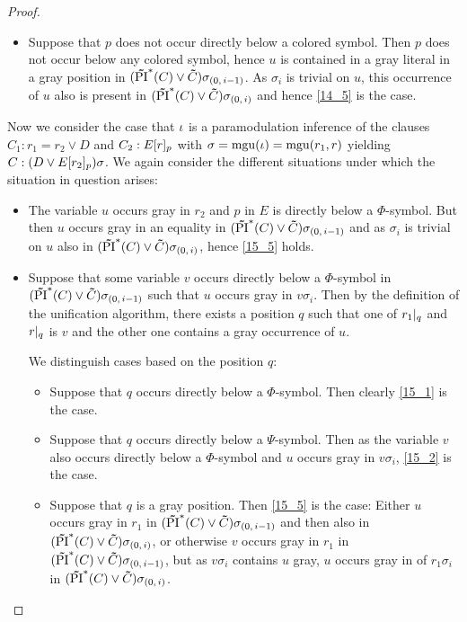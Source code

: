 \documentclass[%
	draft=false,%
	numbers=noendperiod,%
	11pt,%
	a4paper,%
	oneside,%
	openany,%
]{memoir}
\begin{document}
\begin{proof}
\begin{itemize}
\begin{itemize}
				\item
					Suppose that $p$ does not occur directly below a colored symbol.
					Then $p$ does not occur below any colored symbol, hence $u$ is contained in a gray literal in a gray position in $(\bm\tilde{\operatorname{PI}}^{*}(C)\lor \bm\tilde{C})\sigma_{(0,\,i-1)}$. 
					As $\sigma_i$ is trivial on $u$, this occurrence of $u$ also is present in $(\bm\tilde{\operatorname{PI}}^{*}(C)\lor \bm\tilde{C})\sigma_{(0,\,i)}$ and hence \ref{14_5} is the case.

			\end{itemize}
	\end{itemize}

	Now we consider the case that $\iota$ is a paramodulation inference of the clauses $C_1: r_1=r_2 \lor D$ and $C_2: E{[r]_{p}}$ with $\sigma=\operatorname{mgu}(\iota)=\operatorname{mgu}(r_1, r)$ yielding $C: (D\lor E{[r_2]_{p}})\sigma$.
	We again consider the different situations under which the situation in question arises:

	\begin{itemize}

		\item
			The variable $u$ occurs gray in $r_2$ and $p$ in $E$ is directly below a $\Phi$-symbol. 
			But then $u$ occurs gray in an equality in $(\bm\tilde{\operatorname{PI}}^{*}(C)\lor \bm\tilde{C})\sigma_{(0,\,i-1)}$ and as $\sigma_i$ is trivial on $u$ also in $(\bm\tilde{\operatorname{PI}}^{*}(C)\lor \bm\tilde{C})\sigma_{(0,\,i)}$, hence \ref{15_5} holds.

		\item
			Suppose that some variable $v$ occurs directly below a $\Phi$-symbol in $(\bm\tilde{\operatorname{PI}}^{*}(C)\lor \bm\tilde{C})\sigma_{(0,\,i-1)}$ such that $u$ occurs gray in $v\sigma_i$.
			Then by the definition of the unification algorithm, there exists a position $q$ such that one of $r_1|_{q}$ and $r|_{q}$ is $v$ and the other one contains a gray occurrence of $u$.

			We distinguish cases based on the position $q$:

			\begin{itemize}
				\item
					Suppose that $q$ occurs directly below a $\Phi$-symbol. Then clearly \ref{15_1} is the case.

				\item
					Suppose that $q$ occurs directly below a $\Psi$-symbol. Then as the variable $v$ also occurs directly below a $\Phi$-symbol and $u$ occurs gray in $v\sigma_i$, \ref{15_2} is the case.

				\item
					Suppose that $q$ is a gray position.
					Then \ref{15_5} is the case: 
					Either $u$ occurs gray in $r_1$ in $(\bm\tilde{\operatorname{PI}}^{*}(C)\lor \bm\tilde{C})\sigma_{(0,\,i-1)}$ and then also in $(\bm\tilde{\operatorname{PI}}^{*}(C)\lor \bm\tilde{C})\sigma_{(0,\,i)}$, 
					or otherwise $v$ occurs gray in $r_1$ in $(\bm\tilde{\operatorname{PI}}^{*}(C)\lor \bm\tilde{C})\sigma_{(0,\,i-1)}$, but as $v\sigma_i$ contains $u$ gray, $u$ occurs gray in of $r_1\sigma_i$ in $(\bm\tilde{\operatorname{PI}}^{*}(C)\lor \bm\tilde{C})\sigma_{(0,\,i)}$.
					\qedhere
			\end{itemize}

	\end{itemize}

\end{proof}
\end{document}
